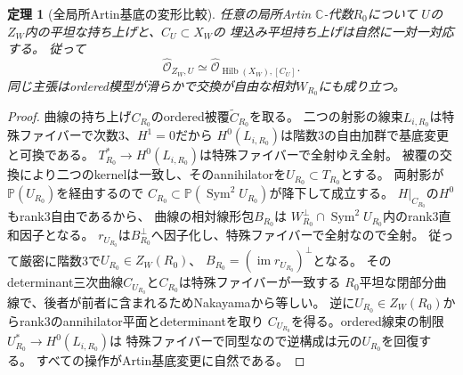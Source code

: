 \documentclass[11pt,a4paper]{ltjsarticle}
\newtheorem{theorem}{定理}[section]
\newcommand{\CC}{\mathbb C}
\newcommand{\PP}{\mathbb P}
\newcommand{\OO}{\mathcal O}
\newcommand{\Hilb}{\operatorname{Hilb}}
\newcommand{\Sym}{\operatorname{Sym}}
\begin{document}
\begin{theorem}[全局所Artin基底の変形比較]\label{thm:artin}
任意の局所Artin $\CC$-代数$R_0$について
$U$の$Z_W$内の平坦な持ち上げと、$C_U\subset X_W$の
埋込み平坦持ち上げは自然に一対一対応する。
従って
\[
\widehat{\OO}_{Z_W,U}\simeq\widehat{\OO}_{\Hilb(X_W),[C_U]}.
\]
同じ主張はordered模型が滑らかで交換が自由な相対$W_{R_0}$にも成り立つ。
\end{theorem}
\begin{proof}
曲線の持ち上げ$C_{R_0}$のordered被覆$\widetilde C_{R_0}$を取る。
二つの射影の線束$L_{i,R_0}$は特殊ファイバーで次数3、$H^1=0$だから
$H^0(L_{i,R_0})$は階数3の自由加群で基底変更と可換である。
$T_{R_0}^*\to H^0(L_{i,R_0})$は特殊ファイバーで全射ゆえ全射。
被覆の交換により二つのkernelは一致し、そのannihilatorを$U_{R_0}\subset T_{R_0}$とする。
両射影が$\PP(U_{R_0})$を経由するので
$C_{R_0}\subset\PP(\Sym^2U_{R_0})$が降下して成立する。
$H|_{C_{R_0}}$の$H^0$もrank3自由であるから、
曲線の相対線形包$B_{R_0}$は
$W_{R_0}^\perp\cap\Sym^2U_{R_0}$内のrank3直和因子となる。
$r_{U_{R_0}}$は$B_{R_0}^\perp$へ因子化し、特殊ファイバーで全射なので全射。
従って厳密に階数3で$U_{R_0}\in Z_W(R_0)$、
$B_{R_0}=(\operatorname{im}r_{U_{R_0}})^\perp$となる。
そのdeterminant三次曲線$C_{U_{R_0}}$と$C_{R_0}$は特殊ファイバーが一致する
$R_0$平坦な閉部分曲線で、後者が前者に含まれるためNakayamaから等しい。
逆に$U_{R_0}\in Z_W(R_0)$からrank3のannihilator平面とdeterminantを取り
$C_{U_{R_0}}$を得る。ordered線束の制限$U_{R_0}^*\to H^0(L_{i,R_0})$は
特殊ファイバーで同型なので逆構成は元の$U_{R_0}$を回復する。
すべての操作がArtin基底変更に自然である。
\end{proof}
\end{document}
